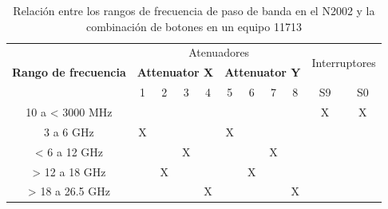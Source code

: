 \begin{table}[h]
	\centering
	\begin{tabularx}{0.6\textwidth}{|c|c|c|c|c|c|c|c|c|c|c|}
		\hline
		\multirow{3}{*}{\bfseries Rango de frecuencia} &
		\multicolumn{8}{c}{Atenuadores} & 
		\multicolumn{2}{c}{\multirow{2}{*}{Interruptores}} \\	
				& \multicolumn{4}{c}{\bfseries Attenuator X} 
				& \multicolumn{4}{c}{\bfseries Attenuator Y} \\
		\cline{2-11}				
				  						& 1 & 2 & 3 & 4 & 5 & 6 & 7 & 8  & S9 & S0 \\
		\hline
		10 a < 3000 \si{\mega\hertz}    &   &   &   &   &   &   &   &    &  X &  X \\
		3 a 6 \si{\giga\hertz} 			& X &   &   &   & X &   &   &    &    &    \\
		< 6 a 12 \si{\giga\hertz}		&   &   & X &   &   &   & X &    &    &    \\				
		> 12 a 18 \si{\giga\hertz}		&   & X &   &   &   & X &   &    &    &    \\
		> 18 a 26.5 \si{\giga\hertz}	&   &   &   & X &   &   &   & X  &    &    \\	
		
		\hline
		
	\end{tabularx}
	\caption{Relación entre los rangos de frecuencia de paso de banda en el N2002 y la combinación de botones en un equipo 11713}
	\label{Tab:ControlRangoFrecuencia11713}
\end{table}
	
	